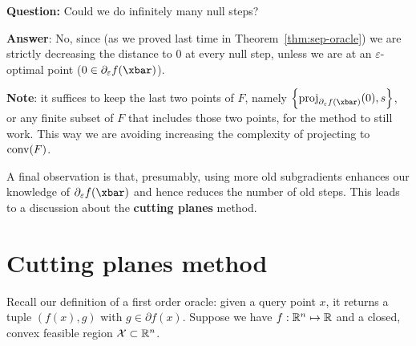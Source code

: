 \noindent \textbf{Question:} Could we do infinitely many null steps?

\noindent \textbf{Answer}: No, since (as we proved last time in
Theorem~\ref{thm:sep-oracle}) we are strictly decreasing the distance to $0$ at
every null step, unless we are at an $\varepsilon$-optimal point ($0 \in
\epsdiff f(\xbar)$).

\noindent \textbf{Note}: it suffices to keep the last two points of $F$, namely
$\set{\proj_{\epsdiff f(\xbar)}(0), s}$, or any finite subset of $F$ that
includes those two points, for the method to still work. This way we are
avoiding increasing the complexity of projecting to $\mathrm{conv}(F)$.

A final observation is that, presumably, using more old subgradients enhances
our knowledge of $\epsdiff f(\xbar)$ and hence reduces the number of old steps.
This leads to a discussion about the \textbf{cutting planes} method.

\section{Cutting planes method}
Recall our definition of a first order oracle: given a query point $x$, it
returns a tuple $(f(x), g)$ with $g \in \partial f(x)$. Suppose we have $f:
\mathbb{R}^n \mapsto \mathbb{R}$ and a closed, convex feasible region $\mathcal{X} \subset \mathbb{R}^n$.

